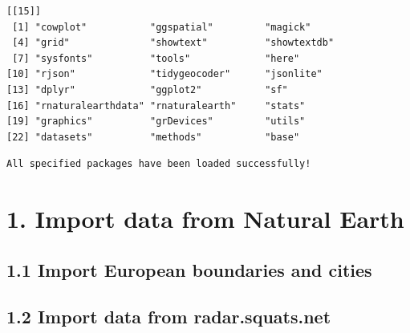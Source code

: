 \documentclass[
  letterpaper,
  DIV=11,
  numbers=noendperiod]{scrartcl}
\begin{document}
\begin{verbatim}
[[15]]
 [1] "cowplot"           "ggspatial"         "magick"           
 [4] "grid"              "showtext"          "showtextdb"       
 [7] "sysfonts"          "tools"             "here"             
[10] "rjson"             "tidygeocoder"      "jsonlite"         
[13] "dplyr"             "ggplot2"           "sf"               
[16] "rnaturalearthdata" "rnaturalearth"     "stats"            
[19] "graphics"          "grDevices"         "utils"            
[22] "datasets"          "methods"           "base"             
\end{verbatim}

\begin{verbatim}
All specified packages have been loaded successfully!
\end{verbatim}

\section{1. Import data from Natural
Earth}\label{import-data-from-natural-earth}

\subsection{1.1 Import European boundaries and
cities}\label{import-european-boundaries-and-cities}

\subsection{1.2 Import data from
radar.squats.net}\label{import-data-from-radar.squats.net}
\end{document}
